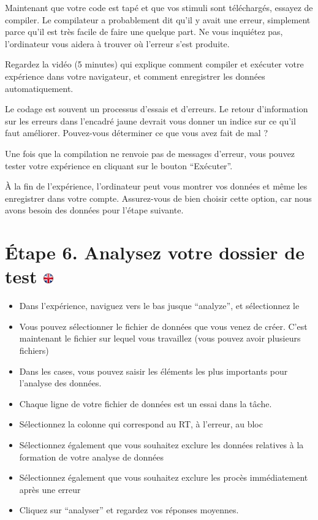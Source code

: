 \documentclass[
]{book}
\providecommand{\tightlist}{%
  \setlength{\itemsep}{0pt}\setlength{\parskip}{0pt}}
\begin{document}
Maintenant que votre code est tapé et que vos stimuli sont téléchargés, essayez de compiler. Le compilateur a probablement dit qu'il y avait une erreur, simplement parce qu'il est très facile de faire une quelque part. Ne vous inquiétez pas, l'ordinateur vous aidera à trouver où l'erreur s'est produite.

Regardez la vidéo (5 minutes) qui explique comment compiler et exécuter votre expérience dans votre navigateur, et comment enregistrer les données automatiquement.

Le codage est souvent un processus d'essais et d'erreurs. Le retour d'information sur les erreurs dans l'encadré jaune devrait vous donner un indice sur ce qu'il faut améliorer. Pouvez-vous déterminer ce que vous avez fait de mal ?

Une fois que la compilation ne renvoie pas de messages d'erreur, vous pouvez tester votre expérience en cliquant sur le bouton ``Exécuter''.

À la fin de l'expérience, l'ordinateur peut vous montrer vos données et même les enregistrer dans votre compte. Assurez-vous de bien choisir cette option, car nous avons besoin des données pour l'étape suivante.

\hypertarget{uxe9tape-6.-analysez-votre-dossier-de-test}{%
\section[Étape 6. Analysez votre dossier de test ]{\texorpdfstring{Étape 6. Analysez votre dossier de test \href{https://www.psytoolkit.org/lessons/project.html\#_step_6_analyze_your_test_file}{\protect\includegraphics{img/ukflag.png}}}{Étape 6. Analysez votre dossier de test }}\label{uxe9tape-6.-analysez-votre-dossier-de-test}}

\begin{itemize}
\tightlist
\item
  Dans l'expérience, naviguez vers le bas jusque ``analyze'', et sélectionnez le
\item
  Vous pouvez sélectionner le fichier de données que vous venez de créer. C'est maintenant le fichier sur lequel vous travaillez (vous pouvez avoir plusieurs fichiers)
\item
  Dans les cases, vous pouvez saisir les éléments les plus importants pour l'analyse des données.
\item
  Chaque ligne de votre fichier de données est un essai dans la tâche.
\item
  Sélectionnez la colonne qui correspond au RT, à l'erreur, au bloc
\item
  Sélectionnez également que vous souhaitez exclure les données relatives à la formation de votre analyse de données
\item
  Sélectionnez également que vous souhaitez exclure les procès immédiatement après une erreur
\item
  Cliquez sur ``analyser'' et regardez vos réponses moyennes.
\end{itemize}
\end{document}
